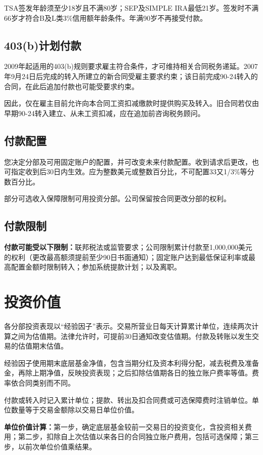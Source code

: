 \documentclass[UTF8,fontset=none,11pt,a4paper]{ctexart}
\begin{document}
TSA签发年龄须至少18岁且不满80岁；SEP及SIMPLE IRA最低21岁。签发时不满66岁才符合B及L类3\%信用额年龄条件。年满90岁不再\allowbreak\mbox{接受付款。}


\subsection*{403(b)计划付款}
2009年起适用的403(b)规则要求雇主符合条件，才可维持相关合同税务递延。2007年9月24日后完成的转入所建立的新合同受雇主要求约束；该日前完成90-24转入的合同，在此后追加付款也可能受\allowbreak\mbox{要求约束。}


因此，仅在雇主目前允许向本合同工资扣减缴款时提供购买及转入。旧合同若仅由早期90-24转入建立、从未工资扣减，应在追加前咨询\allowbreak\mbox{税务顾问。}


\subsection*{付款配置}
您决定分部及可用固定账户的配置，并可改变未来付款配置。收到请求后更改，也可指定收到后30日内生效。应为整数美元或整数百分比，不可配置33又1/3\%等分\allowbreak\mbox{数百分比。}


部分可选收入保障限制可用投资分部。公司保留按合同更改分\allowbreak\mbox{部的权利。}


\subsection*{付款限制}
\textbf{付款可能受以下限制：}联邦税法或监管要求；公司限制累计付款至1,000,000美元的权利（更改最高额须提前至少90日书面通知）；固定账户达到最低保证利率或最高配置金额时限制转入；参加系统提款计划；\allowbreak\mbox{以及离职。}


\section*{投资价值}
各分部投资表现以“经验因子”表示。交易所营业日每天计算累计单位，连续两次计算之间为估值期。法律允许时，可提前30日通知改变估值期。付款及转账以发生交易的估值\allowbreak\mbox{期末估值。}


经验因子使用期末底层基金净值，包含当期分红及资本利得分配，减去税费及准备金，再除上期净值，反映投资表现；之后扣除估值期各日的独立账户费率等值。费率依合同类\allowbreak\mbox{别而不同。}


付款或转入时记入累计单位；提款、转出及扣合同费或可选保障费时注销单位。单位数量等于交易金额除以交易日\allowbreak\mbox{单位价值。}


\textbf{单位价值计算：}第一步，确定底层基金较前一交易日的投资变化，含投资相关费用；第二步，扣除自上次估值以来各日的合同独立账户费用，包括可选保障；第三步，以前次单位价\allowbreak\mbox{值乘结果。}
\end{document}
